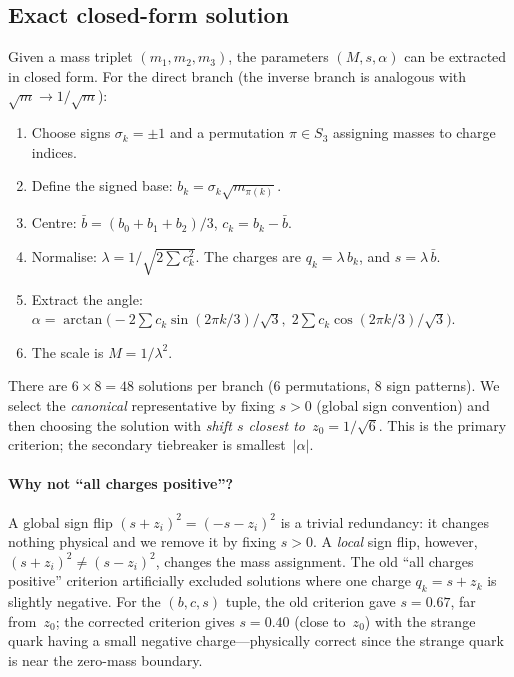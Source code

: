 \documentclass[preprint,12pt]{elsarticle}
\begin{document}
\subsection{Exact closed-form solution}
\label{sec:closed_form}

Given a mass triplet $(m_1, m_2, m_3)$, the parameters
$(M, s, \alpha)$ can be extracted in closed form.
For the direct branch (the inverse branch is analogous
with $\sqrt{m} \to 1/\sqrt{m}$):

\begin{enumerate}
\item Choose signs $\sigma_k = \pm 1$ and a permutation
  $\pi \in S_3$ assigning masses to charge indices.

\item Define the signed base:
  $b_k = \sigma_k \sqrt{m_{\pi(k)}}$.

\item Centre: $\bar{b} = (b_0 + b_1 + b_2)/3$,
  $c_k = b_k - \bar{b}$.

\item Normalise: $\lambda = 1/\sqrt{2\sum c_k^2}$.
  The charges are $q_k = \lambda\,b_k$, and
  $s = \lambda\,\bar{b}$.

\item Extract the angle:
  $\alpha = \arctan\!\bigl(
  -2\sum c_k \sin(2\pi k/3)/\sqrt{3},\;
  2\sum c_k \cos(2\pi k/3)/\sqrt{3}\bigr)$.

\item The scale is $M = 1/\lambda^2$.
\end{enumerate}

\noindent There are $6 \times 8 = 48$ solutions per branch
(6 permutations, 8 sign patterns).  We select the
\emph{canonical} representative by fixing $s > 0$
(global sign convention) and then choosing the solution
with \emph{shift $s$ closest to~$z_0 = 1/\sqrt{6}$}.
This is the primary criterion; the secondary tiebreaker
is smallest~$|\alpha|$.

\paragraph{Why not ``all charges positive''?}
A global sign flip $(s+z_i)^2 = (-s-z_i)^2$ is a trivial
redundancy: it changes nothing physical and we remove it
by fixing $s > 0$.  A \emph{local} sign flip, however,
$(s+z_i)^2 \neq (s-z_i)^2$, changes the mass
assignment.  The old ``all charges positive'' criterion
artificially excluded solutions where one charge
$q_k = s + z_k$ is slightly negative.  For the $(b,c,s)$
tuple, the old criterion gave $s = 0.67$, far from~$z_0$;
the corrected criterion gives $s = 0.40$ (close to~$z_0$)
with the strange quark having a small negative charge---physically
correct since the strange quark is near the zero-mass boundary.
\end{document}
